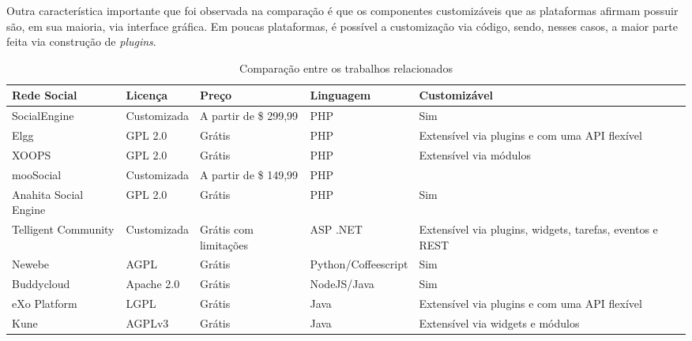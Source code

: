 Outra característica importante que foi observada na comparação é que os componentes customizáveis que as plataformas afirmam possuir são, em sua maioria, via interface gráfica. Em poucas plataformas, é possível a customização via código, sendo, nesses casos, a maior parte feita via construção de \textit{plugins}.

\newpage
\begin{table}[]
\centering
\caption{Comparação entre os trabalhos relacionados}
\label{comparacao}
\begin{adjustbox}{width=\textwidth}
\begin{tabular}{@{}llllll@{}}
\toprule
\textbf{Rede Social}  & \textbf{Licença} & \textbf{Preço}        & \textbf{Linguagem}  & \textbf{Customizável}                                    \\ \midrule
SocialEngine          & Customizada      & A partir de \$ 299,99 & PHP                 & Sim                                                      \\
Elgg                  & GPL 2.0          & Grátis                & PHP                 & Extensível via plugins e com uma API flexível            \\
XOOPS                 & GPL 2.0          & Grátis                & PHP                 & Extensível via módulos                                   \\
mooSocial             & Customizada      & A partir de \$ 149,99 & PHP                 &                                                          \\
Anahita Social Engine & GPL 2.0          & Grátis                & PHP                 & Sim                                                      \\
Telligent Community   & Customizada      & Grátis com limitações & ASP .NET            & Extensível via plugins, widgets, tarefas, eventos e REST \\
Newebe                & AGPL             & Grátis                & Python/Coffeescript & Sim                                                      \\
Buddycloud            & Apache 2.0       & Grátis                & NodeJS/Java         & Sim                                                      \\
eXo Platform          & LGPL             & Grátis                & Java                & Extensível via plugins e com uma API flexível            \\
Kune                  & AGPLv3           & Grátis                & Java                & Extensível via widgets e módulos                         \\

\end{tabular}
\end{adjustbox}
\end{table}
